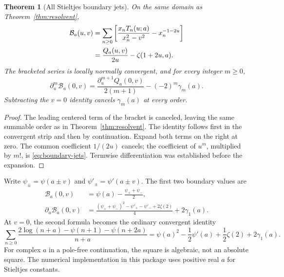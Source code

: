 \documentclass[11pt,a4paper]{article}
\numberwithin{equation}{section}
\newtheorem{theorem}{Theorem}[section]
\theoremstyle{definition}\newtheorem{definition}[theorem]{Definition}
\theoremstyle{remark}\newtheorem{remark}[theorem]{Remark}
\newcommand{\Bcal}{\mathcal B}\newcommand{\Lcal}{\mathfrak L}
\begin{document}
\begin{theorem}[All Stieltjes boundary jets]
\label{thm:boundary}
On the same domain as Theorem~\ref{thm:resolvent},
\begin{align}
 \Bcal_a(u,v)&=\sum_{n\ge0}
 \left[\frac{x_nT_n(u;a)}{x_n^2-v^2}-x_n^{-1-2u}\right]\notag\\
 &=\frac{Q_a(u,v)}{2u}-\zeta(1+2u,a).
 \label{eq:boundary}
\end{align}
The bracketed series is locally normally convergent, and for every
integer $m\ge0$,
\begin{equation}
 \partial_u^m\Bcal_a(0,v)
 =\frac{\partial_u^{m+1}Q_a(0,v)}{2(m+1)}-(-2)^m\gamma_m(a).
 \label{eq:boundary-jets}
\end{equation}
Subtracting the $v=0$ identity cancels $\gamma_m(a)$ at every order.
\end{theorem}
\begin{proof}
The leading centered term of the bracket is canceled, leaving the same
summable order as in Theorem~\ref{thm:resolvent}. The identity follows
first in the convergent strip and then by continuation. Expand both
terms on the right at zero. The common coefficient $1/(2u)$ cancels;
the coefficient of $u^m$, multiplied by $m!$, is
\eqref{eq:boundary-jets}. Termwise differentiation was established
before the expansion.
\end{proof}

Write $\psi_\pm=\psi(a\pm v)$ and
$\psi'_\pm=\psi'(a\pm v)$. The first two boundary values are
\begin{align}
 \Bcal_a(0,v)&=\psi(a)-\frac{\psi_++\psi_-}{2},\label{eq:boundary0}\\
 \partial_u\Bcal_a(0,v)&=
 \frac{(\psi_++\psi_-)^2-\psi'_+-\psi'_-+2\zeta(2)}4
                  +2\gamma_1(a).\label{eq:boundary1}
\end{align}
At $v=0$, the second formula becomes the ordinary convergent identity
\begin{equation}
 \sum_{n\ge0}\frac{2\log(n+a)-\psi(n+1)-\psi(n+2a)}{n+a}
 =\psi(a)^2-\frac12\psi'(a)+\frac12\zeta(2)+2\gamma_1(a).
 \label{eq:stieltjes-linear}
\end{equation}
For complex $a$ in a pole-free continuation, the square is algebraic,
not an absolute square. The numerical implementation in this package
uses positive real $a$ for Stieltjes constants.
\end{document}
